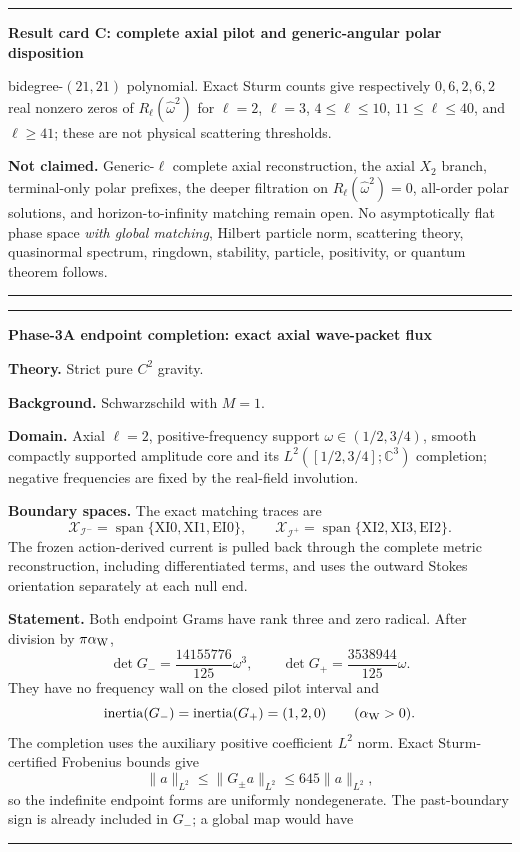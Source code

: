\documentclass[11pt]{article}
\newenvironment{resultcard}[1]
 {\par\medskip\noindent\hrule\smallskip\noindent\textbf{#1}\par\smallskip}
 {\par\smallskip\hrule\medskip}
\begin{document}
\begin{resultcard}{Result card C: complete axial pilot and generic-angular polar disposition}
bidegree-$(21,21)$ polynomial.  Exact Sturm counts give respectively
$0,6,2,6,2$ real nonzero zeros of $R_\ell(\widehat\omega^2)$ for
$\ell=2$, $\ell=3$, $4\le\ell\le10$, $11\le\ell\le40$, and
$\ell\ge41$; these are not physical scattering thresholds.\par
\textbf{Not claimed.} Generic-$\ell$ complete axial reconstruction, the axial
$X_2$ branch, terminal-only polar prefixes,
the deeper filtration on $R_\ell(\widehat\omega^2)=0$, all-order polar solutions, and
horizon-to-infinity matching remain open.  No asymptotically flat phase
space \emph{with global matching}, Hilbert particle norm, scattering theory,
quasinormal spectrum, ringdown, stability, particle, positivity, or quantum
theorem follows.
\end{resultcard}

\begin{resultcard}{Phase-3A endpoint completion: exact axial wave-packet flux}
\textbf{Theory.} Strict pure \(C^2\) gravity.\par
\textbf{Background.} Schwarzschild with \(M=1\).\par
\textbf{Domain.} Axial \(\ell=2\), positive-frequency support
\(\omega\in(1/2,3/4)\), smooth compactly supported amplitude core and its
\(L^2([1/2,3/4];\mathbb C^3)\) completion; negative frequencies are fixed by
the real-field involution.\par
\textbf{Boundary spaces.} The exact matching traces are
\[
 \mathcal X_{\mathscr I^-}
 =\operatorname{span}\{\mathrm{XI0},\mathrm{XI1},\mathrm{EI0}\},
 \qquad
 \mathcal X_{\mathscr I^+}
 =\operatorname{span}\{\mathrm{XI2},\mathrm{XI3},\mathrm{EI2}\}.
\]
The frozen action-derived current is pulled back through the complete metric
reconstruction, including differentiated terms, and uses the outward Stokes
orientation separately at each null end.\par
\textbf{Statement.} Both endpoint Grams have rank three and zero radical.
After division by \(\pi\alpha_{\rm W}\),
\[
 \det G_-=\frac{14155776}{125}\omega^3,
 \qquad
 \det G_+=\frac{3538944}{125}\omega .
\]
They have no frequency wall on the closed pilot interval and
\[
 \operatorname{inertia}(G_-)
 =\operatorname{inertia}(G_+)=(1,2,0)
 \qquad(\alpha_{\rm W}>0).
\]
The completion uses the auxiliary positive coefficient \(L^2\) norm.
Exact Sturm-certified Frobenius bounds give
\[
 \|a\|_{L^2}\leq\|G_\pm a\|_{L^2}
 \leq645\|a\|_{L^2},
\]
so the indefinite endpoint forms are uniformly nondegenerate.  The
past-boundary sign is already included in \(G_-\); a global map would have

\end{resultcard}
\end{document}
